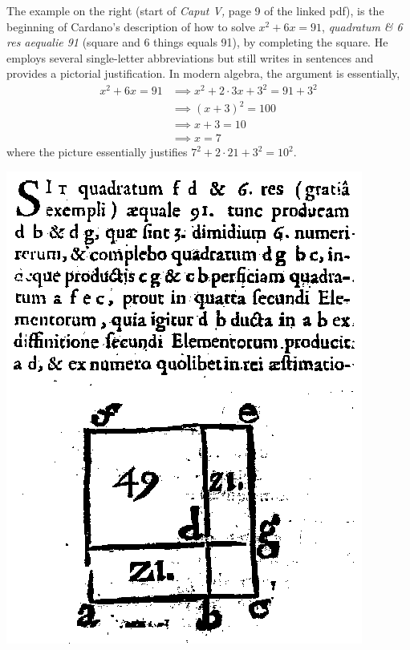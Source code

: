 \begin{minipage}[t]{0.65\linewidth}\vspace{0pt}
The example on the right (start of \emph{Caput V,} page 9 of the linked pdf), is the beginning of Cardano's description of how to solve $x^2+6x=91$, \emph{quadratum \& 6 res aequalie 91} (square and 6 things equals 91), by completing the square. He employs several single-letter abbreviations but still writes in sentences and provides a pictorial justification. In modern algebra, the argument is essentially,
\begin{align*}
x^2+6x=91&\implies x^2+2\cdot 3x+3^2=91+3^2\\
&\implies (x+3)^2=100\\
&\implies x+3=10\\
&\implies x=7
\end{align*}
where the picture  essentially justifies $7^2+2\cdot 21+3^2=10^2$.
\end{minipage}\hfill\begin{minipage}[t]{0.32\linewidth}\vspace{-2pt}
\flushright\includegraphics[width=\linewidth]{cardano-quad}
\end{minipage}
\goodbreak



